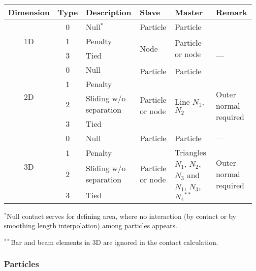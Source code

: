 \begin{tabular}{|c|c|l|l|l|l|}
\hline
{\bf Dimension} & {\bf Type} & {\bf Description} & {\bf Slave} & {\bf Master} & {\bf Remark} \\ \hline
\multirow{4}{*}{1D} & 0 & Null$^*$ & \multirow{2}{*}{Particle} & \multirow{2}{*}{Particle} & \\ \cline{2-3}
& \multirow{2}{*}{1} & \multirow{2}{*}{Penalty} & & & \multirow{4}{*}{---} \\ \cline{4-5}
& & & \multirow{2}{*}{Node} & \multirow{2}{15mm}{Particle or node} & \\ \cline{2-3}
& 3 & Tied & & & \\ \cline{1-5}
\multirow{5}{*}{2D} & 0 & Null & \multirow{2}{*}{Particle} & \multirow{2}{*}{Particle} & \\ \cline{2-3}
& \multirow{2}{*}{1} & \multirow{2}{*}{Penalty} & & & \\ \cline{4-6}
& & & \multirow{3}{15mm}{Particle or node} & \multirow{3}{*}{Line $N_1$, $N_2$} & \multirow{3}{15mm}{Outer normal required} \\ \cline{2-3}
& 2 & Sliding w/o separation & & & \\ \cline{2-3}
& 3 & Tied & & & \\ \hline
\multirow{5}{*}{3D} & 0 & Null & \multirow{2}{*}{Particle} & \multirow{2}{*}{Particle} & \multirow{2}{*}{---} \\ \cline {2-3}
& \multirow{2}{*}{1} & \multirow{2}{*}{Penalty} & & & \\ \cline{4-6}
& & & \multirow{3}{15mm}{Particle or node} & \multirow{3}{1in}{Triangles $N_1$, $N_2$, $N_3$ and $N_1$, $N_3$, $N_4$$^{**}$} & \multirow{3}{15mm}{Outer normal required} \\ \cline{2-3}
& 2 & Sliding w/o separation & & & \\ \cline{2-3}
& 3 & Tied & & & \\ \hline
\end{tabular}

$^*$Null contact serves for defining area, where no interaction (by contact or by smoothing length interpolation) among particles appears.

$^{**}$Bar and beam elements in 3D are ignored in the contact calculation.

\newpage


\subsubsection{Particles}

